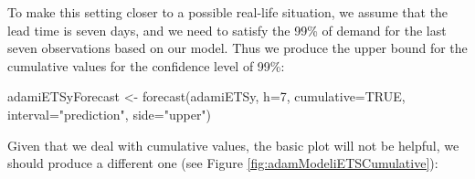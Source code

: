 \documentclass[
]{book}
\newenvironment{Shaded}{\begin{snugshade}}{\end{snugshade}}
\newcommand{\AttributeTok}[1]{\textcolor[rgb]{0.77,0.63,0.00}{#1}}
\newcommand{\ConstantTok}[1]{\textcolor[rgb]{0.00,0.00,0.00}{#1}}
\newcommand{\DecValTok}[1]{\textcolor[rgb]{0.00,0.00,0.81}{#1}}
\newcommand{\FunctionTok}[1]{\textcolor[rgb]{0.00,0.00,0.00}{#1}}
\newcommand{\NormalTok}[1]{#1}
\newcommand{\OtherTok}[1]{\textcolor[rgb]{0.56,0.35,0.01}{#1}}
\newcommand{\SpecialCharTok}[1]{\textcolor[rgb]{0.00,0.00,0.00}{#1}}
\newcommand{\StringTok}[1]{\textcolor[rgb]{0.31,0.60,0.02}{#1}}
\theoremstyle{definition}
\theoremstyle{definition}
\theoremstyle{definition}
\theoremstyle{definition}
\theoremstyle{remark}
\begin{document}
To make this setting closer to a possible real-life situation, we assume that the lead time is seven days, and we need to satisfy the 99\% of demand for the last seven observations based on our model. Thus we produce the upper bound for the cumulative values for the confidence level of 99\%:

\begin{Shaded}
\begin{Highlighting}[]
\NormalTok{adamiETSyForecast }\OtherTok{\textless{}{-}} \FunctionTok{forecast}\NormalTok{(adamiETSy, }\AttributeTok{h=}\DecValTok{7}\NormalTok{,}
                              \AttributeTok{cumulative=}\ConstantTok{TRUE}\NormalTok{,}
                              \AttributeTok{interval=}\StringTok{"prediction"}\NormalTok{,}
                              \AttributeTok{side=}\StringTok{"upper"}\NormalTok{)}
\end{Highlighting}
\end{Shaded}

Given that we deal with cumulative values, the basic plot will not be helpful, we should produce a different one (see Figure \ref{fig:adamModeliETSCumulative}):

\begin{Shaded}
\end{Shaded}
\end{document}

